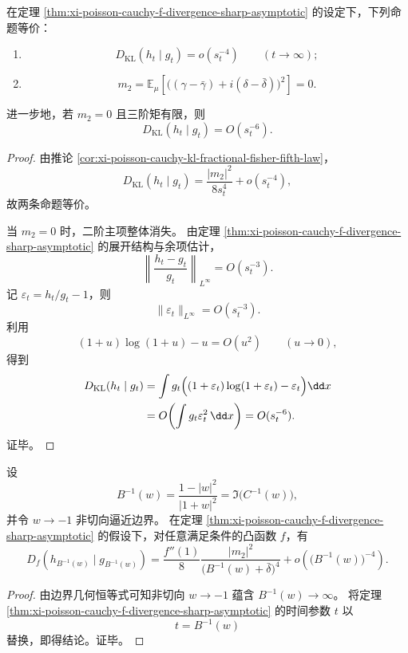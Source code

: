 \begin{proposition}[超四次衰减的伪协方差刚性]\label{prop:xi-poisson-cauchy-superquartic-rigidity}
在定理 \ref{thm:xi-poisson-cauchy-f-divergence-sharp-asymptotic} 的设定下，下列命题等价：
\begin{enumerate}
  \item
  \[
  D_{\mathrm{KL}}(h_t\mid g_t)=o(s_t^{-4})\qquad (t\to\infty);
  \]
  \item
  \[
  m_2=\mathbb E_\mu\!\left[\bigl((\gamma-\bar\gamma)+i(\delta-\bar\delta)\bigr)^2\right]=0.
  \]
\end{enumerate}
进一步地，若 \(m_2=0\) 且三阶矩有限，则
\[
D_{\mathrm{KL}}(h_t\mid g_t)=O(s_t^{-6}).
\]
\end{proposition}
\begin{proof}
由推论 \ref{cor:xi-poisson-cauchy-kl-fractional-fisher-fifth-law}，
\[
D_{\mathrm{KL}}(h_t\mid g_t)
=\frac{|m_2|^2}{8s_t^4}+o(s_t^{-4}),
\]
故两条命题等价。

当 \(m_2=0\) 时，二阶主项整体消失。
由定理 \ref{thm:xi-poisson-cauchy-f-divergence-sharp-asymptotic} 的展开结构与余项估计，
\[
\left\|\frac{h_t-g_t}{g_t}\right\|_{L^\infty}=O(s_t^{-3}).
\]
记 \(\varepsilon_t=h_t/g_t-1\)，则
\[
\|\varepsilon_t\|_{L^\infty}=O(s_t^{-3}).
\]
利用
\[
(1+u)\log(1+u)-u=O(u^2)\qquad(u\to0),
\]
得到
\[
\begin{aligned}
D_{\mathrm{KL}}(h_t\mid g_t)
&=\int g_t\Bigl((1+\varepsilon_t)\log(1+\varepsilon_t)-\varepsilon_t\Bigr)\dd x\\
&=O\!\left(\int g_t\varepsilon_t^2\,\dd x\right)
=O(s_t^{-6}).
\end{aligned}
\]
证毕。
\end{proof}

\begin{theorem}\label{thm:xi-poisson-cauchy-busemann-boundary-fourth-law}
设
\[
B^{-1}(w)=\frac{1-|w|^2}{|1+w|^2}=\Im\!\bigl(C^{-1}(w)\bigr),
\]
并令 \(w\to-1\) 非切向逼近边界。
在定理 \ref{thm:xi-poisson-cauchy-f-divergence-sharp-asymptotic} 的假设下，对任意满足条件的凸函数 \(f\)，有
\[
D_f\!\left(h_{B^{-1}(w)}\mid g_{B^{-1}(w)}\right)
=\frac{f''(1)}{8}\frac{|m_2|^2}{\bigl(B^{-1}(w)+\bar\delta\bigr)^4}
+o\!\left(\bigl(B^{-1}(w)\bigr)^{-4}\right).
\]
\end{theorem}
\begin{proof}
由边界几何恒等式可知非切向 \(w\to-1\) 蕴含 \(B^{-1}(w)\to\infty\)。
将定理 \ref{thm:xi-poisson-cauchy-f-divergence-sharp-asymptotic} 的时间参数 \(t\) 以
\[
t=B^{-1}(w)
\]
替换，即得结论。证毕。
\end{proof}

